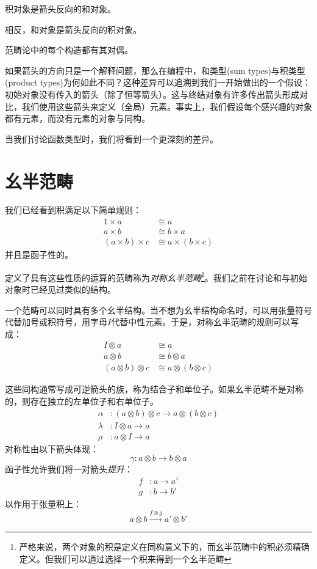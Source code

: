 \documentclass[DaoFP]{subfiles}
\begin{document}
积对象是箭头反向的和对象。

相反，和对象是箭头反向的积对象。

\medskip

范畴论中的每个构造都有其对偶。

\medskip

如果箭头的方向只是一个解释问题，那么在编程中，和类型(sum types)与积类型(product types)为何如此不同？这种差异可以追溯到我们一开始做出的一个假设：初始对象没有传入的箭头（除了恒等箭头）。这与终结对象有许多传出箭头形成对比，我们使用这些箭头来定义（全局）元素。事实上，我们假设每个感兴趣的对象都有元素，而没有元素的对象与同构。

当我们讨论函数类型时，我们将看到一个更深刻的差异。

\section{幺半范畴}

我们已经看到积满足以下简单规则：
\begin{align*}
1 \times a &\cong a
\\
a \times b &\cong b \times a
\\
(a \times b) \times c &\cong a \times (b \times c)
\end{align*}
并且是函子性的。

定义了具有这些性质的运算的范畴称为\emph{对称幺半范畴}\footnote{严格来说，两个对象的积是定义在同构意义下的，而幺半范畴中的积必须精确定义。但我们可以通过选择一个积来得到一个幺半范畴}。我们之前在讨论和与初始对象时已经见过类似的结构。

一个范畴可以同时具有多个幺半结构。当不想为幺半结构命名时，可以用张量符号代替加号或积符号，用字母$I$代替中性元素。于是，对称幺半范畴的规则可以写成：
\begin{align*}
I \otimes a &\cong a
\\
a \otimes b &\cong b \otimes a
\\
(a \otimes b) \otimes c &\cong a \otimes (b \otimes c)
\end{align*}

这些同构通常写成可逆箭头的族，称为结合子和单位子。如果幺半范畴不是对称的，则存在独立的左单位子和右单位子。
\begin{align*}
\alpha &\colon (a \otimes b) \otimes c \to a \otimes (b \otimes c)
\\
 \lambda &\colon I \otimes a \to a
 \\
 \rho &\colon a \otimes I \to a
\end{align*}
对称性由以下箭头体现：
\[ \gamma \colon a \otimes b \to b \otimes a \]
函子性允许我们将一对箭头\emph{提升}：
\begin{align*} 
f &\colon a \to a' \\
g &\colon b \to b'
\end{align*}
以作用于张量积上：
\[ a \otimes b \xrightarrow{f \otimes g} a' \otimes b' \]
\end{document}
